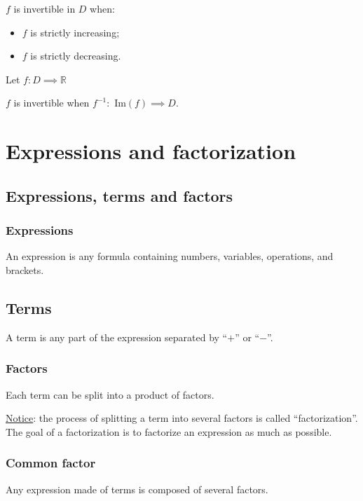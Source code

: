 \documentclass{article}
\begin{document}
$f$ is invertible in $D$ when:
\begin{itemize}
    \item $f$ is strictly increasing;
    \item $f$ is strictly decreasing.
\end{itemize}

Let $f:D \implies \mathbb{R}$

$f$ is invertible when $f^{-1}:$ Im$(f) \implies D$.

\newpage
\section{Expressions and factorization}
\subsection{Expressions, terms and factors}
\subsubsection{Expressions}
An expression is any formula containing numbers, variables, operations, and
brackets.

\subsection{Terms}
A term is any part of the expression separated by ``$+$'' or ``$-$''.

\subsubsection{Factors}
Each term can be split into a product of factors.

\underline{Notice}: the process of splitting a term into several factors is called ``factorization''.\\
\phantom{} \hspace{1cm} The goal of a factorization is to factorize an expression as much as possible.

\subsubsection{Common factor}
Any expression made of terms is composed of several factors.
\end{document}
